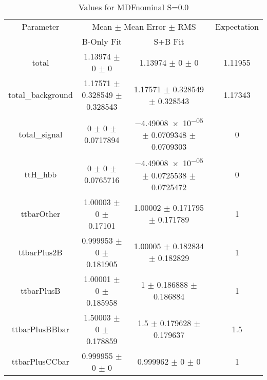 \begin{table}
\centering
\caption{Values for MDFnominal S=0.0}
\begin{tabular}{cccc}
\toprule
Parameter & \multicolumn{2}{c}{Mean $\pm$ Mean Error $\pm$ RMS} & Expectation\\
 & B-Only Fit & S+B Fit & \\
\midrule
total & \num{1.13974} $\pm$ \num{0} $\pm$ \num{0} & \num{1.13974} $\pm$ \num{0} $\pm$ \num{0} & \num{1.11955}\\
total\_background & \num{1.17571} $\pm$ \num{0.328549} $\pm$ \num{0.328543} & \num{1.17571} $\pm$ \num{0.328549} $\pm$ \num{0.328543} & \num{1.17343}\\
total\_signal & \num{0} $\pm$ \num{0} $\pm$ \num{0.0717894} & \num{-4.49008e-05} $\pm$ \num{0.0709348} $\pm$ \num{0.0709303} & \num{0}\\
ttH\_hbb & \num{0} $\pm$ \num{0} $\pm$ \num{0.0765716} & \num{-4.49008e-05} $\pm$ \num{0.0725538} $\pm$ \num{0.0725472} & \num{0}\\
ttbarOther & \num{1.00003} $\pm$ \num{0} $\pm$ \num{0.17101} & \num{1.00002} $\pm$ \num{0.171795} $\pm$ \num{0.171789} & \num{1}\\
ttbarPlus2B & \num{0.999953} $\pm$ \num{0} $\pm$ \num{0.181905} & \num{1.00005} $\pm$ \num{0.182834} $\pm$ \num{0.182829} & \num{1}\\
ttbarPlusB & \num{1.00001} $\pm$ \num{0} $\pm$ \num{0.185958} & \num{1} $\pm$ \num{0.186888} $\pm$ \num{0.186884} & \num{1}\\
ttbarPlusBBbar & \num{1.50003} $\pm$ \num{0} $\pm$ \num{0.178859} & \num{1.5} $\pm$ \num{0.179628} $\pm$ \num{0.179637} & \num{1.5}\\
ttbarPlusCCbar & \num{0.999955} $\pm$ \num{0} $\pm$ \num{0} & \num{0.999962} $\pm$ \num{0} $\pm$ \num{0} & \num{1}\\
\bottomrule
\end{tabular}
\end{table}